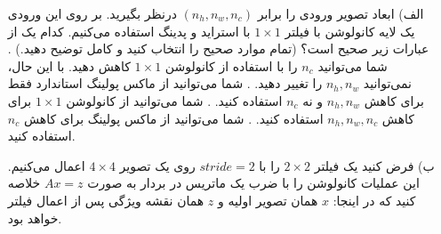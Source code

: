 \begin{itemize}
    \item[الف)]
 ابعاد تصویر ورودی را برابر $(n_h, n_w, n_c)$ درنظر بگیرید. بر روی این ورودی یک لایه کانولوشن با فیلتر $1 \times 1$ با استراید و پدینگ استفاده می‌کنیم. کدام یک از عبارات زیر صحیح است؟ (تمام موارد صحیح را انتخاب کنید و کامل توضیح دهید.)
. شما می‌توانید $n_c$ را با استفاده از کانولوشن $1 \times 1$ کاهش دهید. با این حال، نمی‌توانید $n_h, n_w$ را تغییر دهید.
. شما می‌توانید از ماکس پولینگ استاندارد فقط برای کاهش $n_h, n_w$ و نه $n_c$ استفاده کنید.
. شما می‌توانید از کانولوشن $1 \times 1$ برای کاهش $n_h, n_w, n_c$ استفاده کنید.
. شما می‌توانید از ماکس پولینگ برای کاهش $n_c$ استفاده کنید.
\newline
\newline

\item[ب)]
فرض کنید یک فیلتر $2 \times 2$ را با $stride=2$ روی یک تصویر $4 \times 4$ اعمال می‌کنیم. این عملیات کانولوشن را با ضرب یک ماتریس در بردار به صورت $Ax = z$ خلاصه کنید که در اینجا: $x$ همان تصویر اولیه و $z$ همان نقشه ویژگی پس از اعمال فیلتر خواهد بود.

\vspace{1cm}

\begin{center}
\end{center}
\end{itemize}